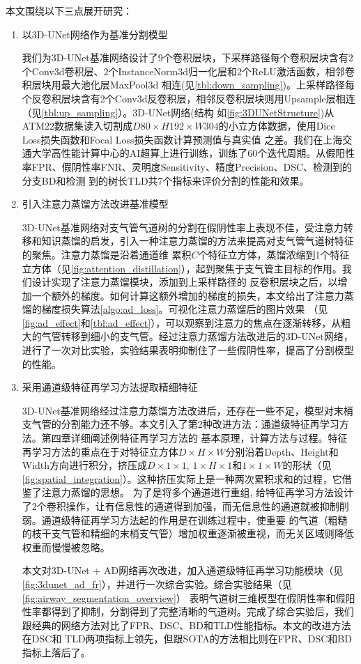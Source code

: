 本文围绕以下三点展开研究：
\begin{enumerate}
    \item {\heiti 以3D-UNet网络作为基准分割模型}

    我们为3D-UNet基准网络设计了9个卷积层块，下采样路径每个卷积层块含有2个Conv3d卷积层、2个InstanceNorm3d归一化层和2个ReLU激活函数，相邻卷积层块用最大池化层MaxPool3d
    相连(见\autoref{tbl:down_sampling})。上采样路径每个反卷积层块含有2个Conv3d反卷积层，相邻反卷积层块则用Upsample层相连（见\autoref{tbl:up_sampling}）。3D-UNet网络(结构
    如\autoref{fig:3DUNetStructure})从ATM22数据集读入切割成$D80 \times H192 \times W304$的小立方体数据，使用Dice Loss损失函数和Focal Loss损失函数计算预测值与真实值
    之差。我们在上海交通大学高性能计算中心的AI超算上进行训练，训练了60个迭代周期。从假阳性率FPR、假阴性率FNR、灵明度Sensitivity、精度Precision、DSC、检测到的分支BD和检测
    到的树长TLD共7个指标来评价分割的性能和效果。

    \item {\heiti 引入注意力蒸馏方法改进基准模型}

    3D-UNet基准网络对支气管气道树的分割在假阴性率上表现不佳，受注意力转移和知识蒸馏的启发，引入一种注意力蒸馏的方法来提高对支气管气道树特征的聚焦。注意力蒸馏是沿着通道维
    累积$C$个特征立方体，蒸馏浓缩到1个特征立方体（见\autoref{fig:attention_distillation}），起到聚焦于支气管主目标的作用。我们设计实现了注意力蒸馏模块，添加到上采样路径的
    反卷积层块之后，以增加一个额外的梯度。如何计算这额外增加的梯度的损失，本文给出了注意力蒸馏的梯度损失算法\ref{algo:ad_loss}。可视化注意力蒸馏后的图片效果
    （见\autoref{fig:ad_effect}和\autoref{tbl:ad_effect}），可以观察到注意力的焦点在逐渐转移，从粗大的气管转移到细小的支气管。经过注意力蒸馏方法改进后的3D-UNet网络，
    进行了一次对比实验，实验结果表明抑制住了一些假阴性率，提高了分割模型的性能。

    \item {\heiti 采用通道级特征再学习方法提取精细特征}

    3D-UNet基准网络经过注意力蒸馏方法改进后，还存在一些不足，模型对末梢支气管的分割能力还不够。本文引入了第2种改进方法：通道级特征再学习方法。第四章详细阐述例特征再学习方法的
    基本原理，计算方法与过程。特征再学习方法的重点在于对特征立方体$D \times H \times W$分别沿着Depth、Height和Width方向进行积分，挤压成$D \times 1 \times 1$, 
    $1 \times H \times 1$和$1 \times 1 \times W$的形状（见\autoref{fig:spatial_integration}）。这种挤压实际上是一种两次累积求和的过程，它借鉴了注意力蒸馏的思想。
    为了是将多个通道进行重组, 给特征再学习方法设计了2个卷积操作，让有信息性的通道得到加强，而无信息性的通道就被抑制削弱。通道级特征再学习方法起的作用是在训练过程中，使重要
    的气道（粗糙的枝干支气管和精细的末梢支气管）增加权重逐渐被重视，而无关区域则降低权重而慢慢被忽略。

    本文对3D-UNet + AD网络再次改进，加入通道级特征再学习功能模块（见\autoref{fig:3dunet_ad_fr}），并进行一次综合实验。综合实验结果（见\autoref{fig:airway_segmentation_overview}）
    表明气道树三维模型在假阴性率和假阳性率都得到了抑制，分割得到了完整清晰的气道树。完成了综合实验后，我们跟经典的网络方法对比了FPR、DSC、BD和TLD性能指标。本文的改进方法在DSC和
    TLD两项指标上领先，但跟SOTA的方法相比则在FPR、DSC和BD指标上落后了。
\end{enumerate}

